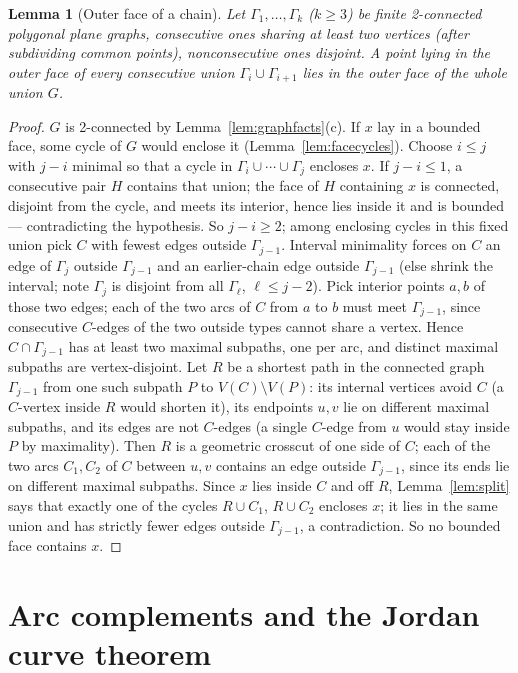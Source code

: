 \documentclass[11pt,a4paper]{article}
\theoremstyle{jsplain}
\newtheorem{lemma}[theorem]{Lemma}
\theoremstyle{jsdefn}
\begin{document}
\begin{lemma}[Outer face of a chain]\label{lem:chain}
Let $\Gamma_1,\dots,\Gamma_k$ \textup($k\ge3$\textup) be finite
2-connected polygonal plane graphs, consecutive ones sharing at least
two vertices \textup(after subdividing common points\textup),
nonconsecutive ones disjoint. A point lying in the outer face of every
consecutive union $\Gamma_i\cup\Gamma_{i+1}$ lies in the outer face of
the whole union $G$.
\end{lemma}
\begin{proof}
$G$ is 2-connected by Lemma~\ref{lem:graphfacts}(c). If $x$ lay in a
bounded face, some cycle of $G$ would enclose it
(Lemma~\ref{lem:facecycles}). Choose $i\le j$ with $j-i$ minimal so
that a cycle in $\Gamma_i\cup\cdots\cup\Gamma_j$ encloses $x$. If
$j-i\le1$, a consecutive pair $H$ contains that union; the face of $H$
containing $x$ is connected, disjoint from the cycle, and meets its
interior, hence lies inside it and is bounded --- contradicting the
hypothesis. So $j-i\ge2$; among enclosing cycles in this fixed union
pick $C$ with fewest edges outside $\Gamma_{j-1}$. Interval minimality
forces on $C$ an edge of $\Gamma_j$ outside $\Gamma_{j-1}$ and an
earlier-chain edge outside $\Gamma_{j-1}$ (else shrink the interval;
note $\Gamma_j$ is disjoint from all $\Gamma_\ell$, $\ell\le j-2$).
Pick interior points $a,b$ of those two edges; each of the two arcs of
$C$ from $a$ to $b$ must meet $\Gamma_{j-1}$, since consecutive
$C$-edges of the two outside types cannot share a vertex. Hence
$C\cap\Gamma_{j-1}$ has at least two maximal subpaths, one per arc,
and distinct maximal subpaths are vertex-disjoint. Let $R$ be a
shortest path in the connected graph $\Gamma_{j-1}$ from one such
subpath $P$ to $V(C)\setminus V(P)$: its internal vertices avoid $C$
(a $C$-vertex inside $R$ would shorten it), its endpoints $u,v$ lie on
different maximal subpaths, and its edges are not $C$-edges (a single
$C$-edge from $u$ would stay inside $P$ by maximality). Then $R$ is a
geometric crosscut of one side of $C$; each of the two arcs
$C_1,C_2$ of $C$ between $u,v$ contains an edge outside
$\Gamma_{j-1}$, since its ends lie on different maximal subpaths. Since
$x$ lies inside $C$ and off $R$, Lemma~\ref{lem:split} says that
exactly one of the cycles $R\cup C_1$,
$R\cup C_2$ encloses $x$; it lies in the same union and has strictly
fewer edges outside $\Gamma_{j-1}$, a contradiction. So no bounded
face contains $x$.
\end{proof}

\section{Arc complements and the Jordan curve theorem}\label{sec:jct}
\end{document}
